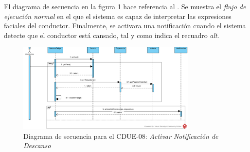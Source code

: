 \par El diagrama de secuencia  en la figura \ref{img:noti_descanso} hace referencia al . Se muestra el \textit{flujo de ejecución normal} en el que el sistema es capaz de interpretar las expresiones faciales del conductor. Finalmente, se activara una notificación cuando el sistema detecte que el conductor está cansado, tal y como indica el recuadro \textit{alt}.

\begin{figure}[H]
  \begin{center}
    \includegraphics[width=0.8\textwidth]{./img/diagramas_de_secuencia/CDUE-08.png}
  \end{center}
  \caption{Diagrama de secuencia para el CDUE-08: \textit{Activar Notificación de Descanso}}
  \label{img:noti_descanso}
\end{figure}
